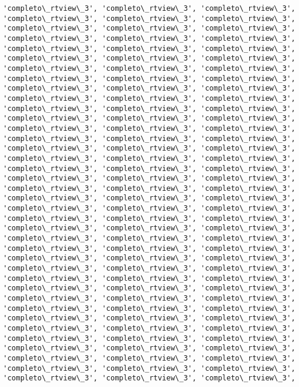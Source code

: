 \documentclass[11pt]{article}
\begin{document}
\begin{Verbatim}[commandchars=\\\{\}]
'completo\_rtview\_3', 'completo\_rtview\_3', 'completo\_rtview\_3',
'completo\_rtview\_3', 'completo\_rtview\_3', 'completo\_rtview\_3',
'completo\_rtview\_3', 'completo\_rtview\_3', 'completo\_rtview\_3',
'completo\_rtview\_3', 'completo\_rtview\_3', 'completo\_rtview\_3',
'completo\_rtview\_3', 'completo\_rtview\_3', 'completo\_rtview\_3',
'completo\_rtview\_3', 'completo\_rtview\_3', 'completo\_rtview\_3',
'completo\_rtview\_3', 'completo\_rtview\_3', 'completo\_rtview\_3',
'completo\_rtview\_3', 'completo\_rtview\_3', 'completo\_rtview\_3',
'completo\_rtview\_3', 'completo\_rtview\_3', 'completo\_rtview\_3',
'completo\_rtview\_3', 'completo\_rtview\_3', 'completo\_rtview\_3',
'completo\_rtview\_3', 'completo\_rtview\_3', 'completo\_rtview\_3',
'completo\_rtview\_3', 'completo\_rtview\_3', 'completo\_rtview\_3',
'completo\_rtview\_3', 'completo\_rtview\_3', 'completo\_rtview\_3',
'completo\_rtview\_3', 'completo\_rtview\_3', 'completo\_rtview\_3',
'completo\_rtview\_3', 'completo\_rtview\_3', 'completo\_rtview\_3',
'completo\_rtview\_3', 'completo\_rtview\_3', 'completo\_rtview\_3',
'completo\_rtview\_3', 'completo\_rtview\_3', 'completo\_rtview\_3',
'completo\_rtview\_3', 'completo\_rtview\_3', 'completo\_rtview\_3',
'completo\_rtview\_3', 'completo\_rtview\_3', 'completo\_rtview\_3',
'completo\_rtview\_3', 'completo\_rtview\_3', 'completo\_rtview\_3',
'completo\_rtview\_3', 'completo\_rtview\_3', 'completo\_rtview\_3',
'completo\_rtview\_3', 'completo\_rtview\_3', 'completo\_rtview\_3',
'completo\_rtview\_3', 'completo\_rtview\_3', 'completo\_rtview\_3',
'completo\_rtview\_3', 'completo\_rtview\_3', 'completo\_rtview\_3',
'completo\_rtview\_3', 'completo\_rtview\_3', 'completo\_rtview\_3',
'completo\_rtview\_3', 'completo\_rtview\_3', 'completo\_rtview\_3',
'completo\_rtview\_3', 'completo\_rtview\_3', 'completo\_rtview\_3',
'completo\_rtview\_3', 'completo\_rtview\_3', 'completo\_rtview\_3',
'completo\_rtview\_3', 'completo\_rtview\_3', 'completo\_rtview\_3',
'completo\_rtview\_3', 'completo\_rtview\_3', 'completo\_rtview\_3',
'completo\_rtview\_3', 'completo\_rtview\_3', 'completo\_rtview\_3',
'completo\_rtview\_3', 'completo\_rtview\_3', 'completo\_rtview\_3',
'completo\_rtview\_3', 'completo\_rtview\_3', 'completo\_rtview\_3',
'completo\_rtview\_3', 'completo\_rtview\_3', 'completo\_rtview\_3',
'completo\_rtview\_3', 'completo\_rtview\_3', 'completo\_rtview\_3',
'completo\_rtview\_3', 'completo\_rtview\_3', 'completo\_rtview\_3',
'completo\_rtview\_3', 'completo\_rtview\_3', 'completo\_rtview\_3',
'completo\_rtview\_3', 'completo\_rtview\_3', 'completo\_rtview\_3',

\end{Verbatim}
\end{document}
